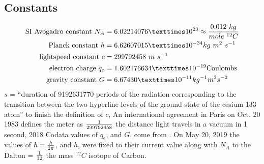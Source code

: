 \begin{multicols}{2}
\section{Constants}\begin{align*}%
\text{SI Avogadro constant } N_A&= 6.02214076×10^{23} \approx {0.012~ kg \over mole ~{{}^{12}C}}\\
\text{Planck constant } h&= 6.62607015 × 10^{-34} kg~m^2~ s^{-1}\\
\text{lightspeed constant } c&=299792458 ~m~s^{-1}\\
\text{electron charge }q_e&=1.602176634 × 10^{-19} \text{Coulombs}\\
\text{gravity constant }G&=6.674 30 × 10^{-11}kg^{-1} m^3 s^{-2}
\end{align*}
$s$ = ``duration of 9192631770 periods of the radiation corresponding to the transition between the two hyperfine levels of the ground state of the cesium 133 atom''\citep{CGPM13} %
to finish the definition of $c$, An international agreement in Paris on Oct. 20 1983 defines the meter as $1\over 299792458$ the distance light travels in a vacuum in 1 second\citep{newspaper_1983}, %
2018 Codata values of $q_e$, and $G$, come from \citep{RevModPhys.93.025010}.
On May 20, 2019 the values of $\hbar ={{h} \over {2\pi }} $, and $h$, were fixed to their current value along with $N_A$ to the Dalton = ${1 \over 12}$ the mass  ${}^{12}C$ isotope  of Carbon\citep{Horst1}.

\end{multicols}
